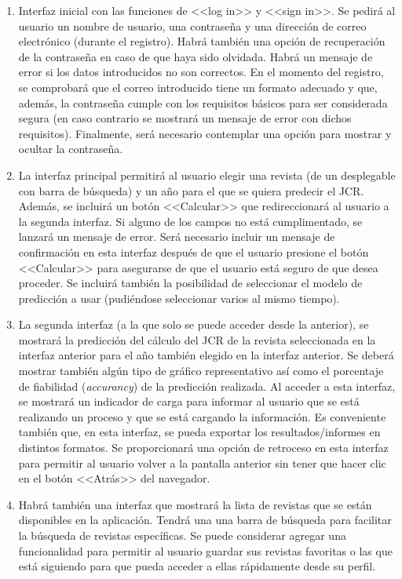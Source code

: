 \begin{enumerate}
	\item Interfaz inicial con las funciones de <<log in>> y <<sign in>>. Se pedirá al usuario un nombre de usuario, una contraseña y una dirección de correo electrónico (durante el registro). Habrá también una opción de recuperación de la contraseña en caso de que haya sido olvidada. Habrá un mensaje de error si los datos introducidos no son correctos. En el momento del registro, se comprobará que el correo introducido tiene un formato adecuado y que, además, la contraseña cumple con los requisitos básicos para ser considerada segura (en caso contrario se mostrará un mensaje de error con dichos requisitos). Finalmente, será necesario contemplar una opción para mostrar y ocultar la contraseña.
	\item La interfaz principal permitirá al usuario elegir una revista (de un desplegable con barra de búsqueda) y un año para el que se quiera predecir el JCR. Además, se incluirá un botón <<Calcular>> que redireccionará al usuario a la segunda interfaz. Si alguno de los campos no está cumplimentado, se lanzará un mensaje de error. Será necesario incluir un mensaje de confirmación en esta interfaz después de que el usuario presione el botón <<Calcular>> para asegurarse de que el usuario está seguro de que desea proceder. Se incluirá también la posibilidad de seleccionar el modelo de predicción a usar (pudiéndose seleccionar varios al mismo tiempo).
	\item La segunda interfaz (a la que solo se puede acceder desde la anterior), se mostrará la predicción del cálculo del JCR de la revista seleccionada en la interfaz anterior para el año también elegido en la interfaz anterior. Se deberá mostrar también algún tipo de gráfico representativo así como el porcentaje de fiabilidad (\textit{accurancy}) de la predicción realizada. Al acceder a esta interfaz, se mostrará un indicador de carga para informar al usuario que se está realizando un proceso y que se está cargando la información. Es conveniente también que, en esta interfaz, se pueda exportar los resultados/informes en distintos formatos. Se proporcionará una opción de retroceso en esta interfaz para permitir al usuario volver a la pantalla anterior sin tener que hacer clic en el botón <<Atrás>> del navegador.
	\item Habrá también una interfaz que mostrará la lista de revistas que se están disponibles en la aplicación. Tendrá una una barra de búsqueda para facilitar la búsqueda de revistas específicas. Se puede considerar agregar una funcionalidad para permitir al usuario guardar sus revistas favoritas o las que está siguiendo para que pueda acceder a ellas rápidamente desde su perfil.

\end{enumerate}
